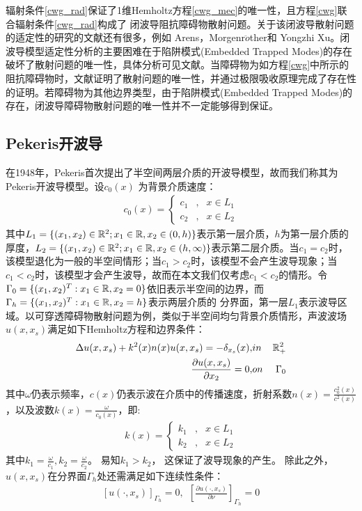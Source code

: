 辐射条件\eqref{cwg_rad}保证了1维Hemholtz方程\eqref{cwg_mec}的唯一性，且方程\eqref{cwg}联合辐射条件\eqref{cwg_rad}构成了
闭波导阻抗障碍物散射问题。关于该闭波导散射问题的适定性的研究的文献还有很多，例如
Arens\cite{Arens2010Variational,Arens2011Direct}，Morgenr$\ddot{o}$ther\cite{K1988On,K2010on}和 Yongzhi Xu\cite{Xu1990The}。闭波导模型适定性分析的主要困难在于陷阱模式(Embedded Trapped Modes)的存在破坏了散射问题的唯一性，具体分析可见文献\cite{Linton2013Embedded}。当障碍物为如方程\eqref{cwg}中所示的阻抗障碍物时，文献\cite{ch_cw}证明了散射问题的唯一性，并通过极限吸收原理完成了存在性的证明。若障碍物为其他边界类型，由于陷阱模式(Embedded Trapped Modes)的存在，闭波导障碍物散射问题的唯一性并不一定能够得到保证。

\subsection{Pekeris开波导}

在1948年，Pekeris首次提出了半空间两层介质的开波导模型，故而我们称其为Pekeris开波导模型。设$c_0(x)$ 为背景介质速度：
\begin{eqnarray*}
c_0(x)=\left\{
 \begin{array}{lll}
   c_1&,&x\in L_1\\
   c_2&,&x\in L_2
 \end{array}
\right.
\end{eqnarray*}
其中$L_1=\{(x_1,x_2)\in\mathbb{R}^2;x_1\in\mathbb{R},x_2\in(0,h)\}$表示第一层介质，$h$为第一层介质的厚度，$L_2=\{(x_1,x_2)\in\mathbb{R}^2;x_1\in\mathbb{R},x_2\in(h,\infty)\}$表示第二层介质。当$c_1=c_2$时，该模型退化为一般的半空间情形；当$c_1>c_2$时，该模型不会产生波导现象；当$c_1<c_2$时，该模型才会产生波导，故而在本文我们仅考虑$c_1<c_2$的情形。令$\Gamma_0=\{(x_1,x_2)^T:x_1\in\mathbb{R},x_2=0\}$依旧表示半空间的边界，而$\Gamma_h=\{(x_1,x_2)^T:x_1\in\mathbb{R},x_2=h\}$表示两层介质的
分界面，第一层$L_1$表示波导区域。以可穿透障碍物散射问题为例，类似于半空间均匀背景介质情形，声波波场$u(x,x_s)$满足如下Hemholtz方程和边界条件：
\begin{eqnarray}
 \Delta u(x,x_s)+k^2(x)n(x)u(x,x_s)=-\delta_{x_s}(x),&in&\mathbb{R}^2_+   \label{into_q1_1}\\
 \frac{\partial u(x,x_s)}{\partial x_2}=0,&on&\Gamma_0  \label{into_q1_2}
\end{eqnarray}
其中$\omega$仍表示频率，$c(x)$仍表示波在介质中的传播速度，折射系数$n(x)=\frac{c_0^2(x)}{c^2(x)}$，以及波数$k(x)=\frac{\omega}{c_0(x)}$，即:
\begin{eqnarray*}
k(x)=\left\{
 \begin{array}{lll}
   k_1&,&x\in L_1\\
   k_2&,&x\in L_2
 \end{array}
\right.
\end{eqnarray*}
其中$k_1=\frac{\omega}{c_1},k_2=\frac{\omega}{c_2}$。 易知$k_1>k_2$， 这保证了波导现象的产生。
除此之外，$u(x,x_s)$在分界面$\Gamma_h$处还需满足如下连续性条件：
\begin{eqnarray}
 \left[u(\cdot,x_s)\right]_{\Gamma_h}=0,\ \ \left[\frac{\partial u(\cdot,x_s)}{\partial\nu}\right]_{\Gamma_h}=0 \label{into_q1_3}
\end{eqnarray}


